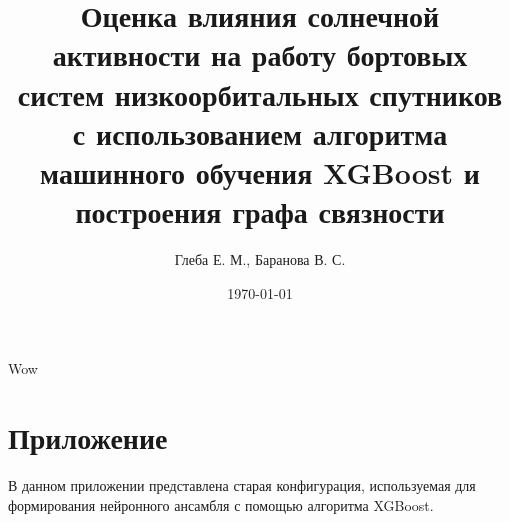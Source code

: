 \documentclass[14pt, a4paper]{src/bsu}
\title{Оценка влияния солнечной активности на работу бортовых систем
  низкоорбитальных спутников с использованием алгоритма машинного обучения
XGBoost и построения графа связности}
\author{Глеба Е. М., Баранова В. С.}
\date{\today}
\begin{document}

Wow \cite{green_2017_impact}

\newpage


\newpage

\titleformat{\section}[block]{\large\bfseries\filcenter}{}{0em}{}

\newpage

\printbibliography[heading=bibintoc,title={Список использованной литературы}]

\newpage

\appendix

\renewcommand{\chaptermark}[1]{\markboth{}{}}
\renewcommand{\sectionmark}[1]{\markright{\arabic{section}.\ #1}}

\titleformat{\section}[block]{\large\bfseries\filcenter}{}{0em}{}

 \label{sec:attachements}

\section{Приложение }
\label{subsec:old_polaris_learn_config}

В данном приложении представлена старая конфигурация, используемая для формирования нейронного ансамбля с помощью алгоритма XGBoost.

%
\end{document}
